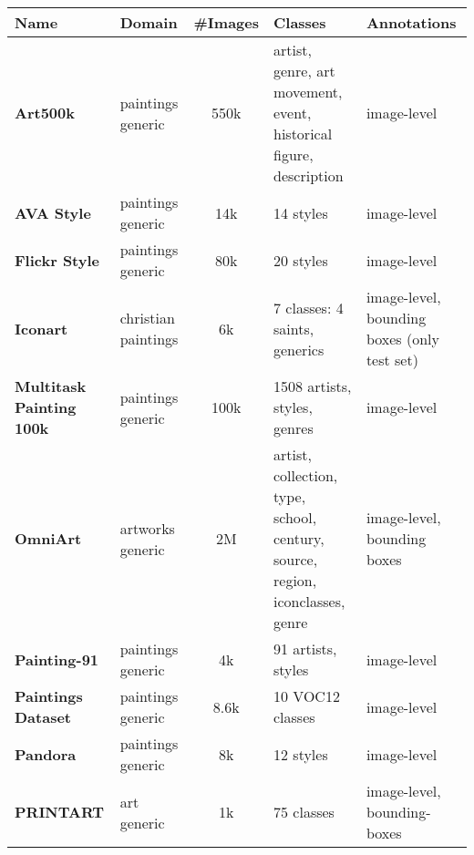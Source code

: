 \documentclass[acmlarge]{acmart}
\begin{document}
\begin{table}[t]
\centering
\small
\begin{tabularx}{\linewidth}{|X|p{2.7cm}|c|m{3cm}|m{2.5cm}|}
\hline
\textbf{Name} & \textbf{Domain} & \textbf{\#Images} & \textbf{Classes} & \textbf{Annotations} \\
\hline
\textbf{Art500k}  \cite{mao2017deepart, mao2019visual} & paintings generic & 550k & artist, genre, \newline art movement, event, historical figure, \newline description & image-level  \\
    \hline
\textbf{AVA Style}  \cite{karayev2013recognizing} & paintings generic & 14k & 14 styles & image-level \\
    \hline
\textbf{Flickr Style} \cite{karayev2013recognizing} & paintings generic & 80k & 20 styles & image-level \\
    \hline
\textbf{Iconart} \cite{gonthier2018weakly} & christian paintings  & 6k & 7 classes: 4 saints, \newline 3 generics & image-level, \newline bounding boxes \newline (only test set) \\
    \hline 
\textbf{Multitask Painting 100k} \cite{Bianco2019MultitaskPC} & paintings generic & 100k & 1508 artists, \newline 125 styles, \newline 41 genres & image-level  \\
    \hline
\textbf{OmniArt} \cite{strezoski2017omniart, strezoski2018omniart} & artworks generic & 2M & artist, collection, \newline type, school, century, source, region, \newline iconclasses, genre & image-level, \newline bounding boxes  \\
    \hline
\textbf{Painting-91} \cite{painting91} & paintings generic & 4k & 91 artists, \newline 13 styles & image-level \\
    \hline
\textbf{Paintings Dataset} \cite{BMVC.28.38, crowley2016art} & paintings generic & 8.6k & 10 VOC12 classes & image-level  \\
    \hline
\textbf{Pandora} \cite{florea2016pandora} & paintings generic & 8k & 12 styles & image-level \\ \hline
\textbf{PRINTART} \cite{carneiro2012artistic} & art generic & 1k & 75 classes & image-level, \newline bounding-boxes \\ \hline

\end{tabularx}
\end{table}
\end{document}
